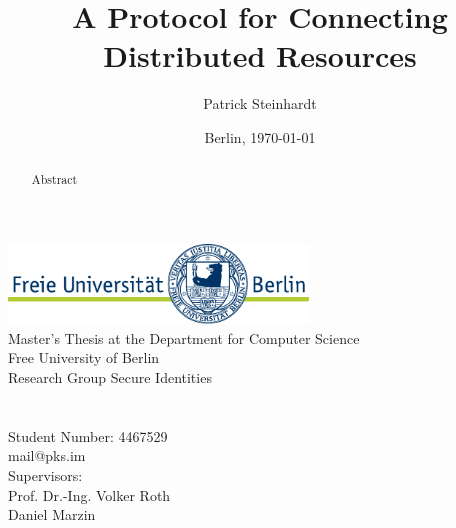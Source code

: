 \documentclass[12pt,a4paper,english]{article}
\title{A Protocol for Connecting Distributed Resources}
\author{Patrick Steinhardt}
\date{Berlin, \today}
\begin{document}
    \begin{titlepage}
        \makeatletter
        \begin{center}
            \includegraphics[width=0.6\textwidth]{resources/fu-logo.pdf}\\
            {\normalsize Master's Thesis at the Department for Computer Science\\Free University of Berlin\\Research Group Secure Identities}\\[8ex]
            {\Large \@title}\\[6ex]
            {\large \@author}\\
            {\normalsize Student Number: 4467529}\\
            {\normalsize mail@pks.im}\\[4ex]
            {\normalsize Supervisors:\\Prof. Dr.-Ing. Volker Roth\\Daniel Marzin}\\[4ex]
            {\normalsize \@date}
        \end{center}
        \makeatother

        \vfill{}
        \begin{abstract}

            Abstract

        \end{abstract}
        \vfill{}
    \end{titlepage}

    
    
    \clearpage

    \tableofcontents
    \clearpage
    \listoffigures
    \clearpage
    \lstlistoflistings
    \clearpage

    \pagestyle{fancy}
    \setcounter{page}{1}

    
    
    
    
    
    

    \clearpage
    \nocite{*}
    
\end{document}
